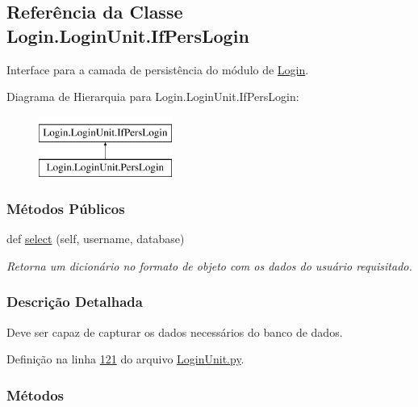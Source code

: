 \hypertarget{classLogin_1_1LoginUnit_1_1IfPersLogin}{}\subsection{Referência da Classe Login.\+Login\+Unit.\+If\+Pers\+Login}
\label{classLogin_1_1LoginUnit_1_1IfPersLogin}


Interface para a camada de persistência do módulo de \hyperlink{namespaceLogin}{Login}.  


Diagrama de Hierarquia para Login.\+Login\+Unit.\+If\+Pers\+Login\+:\begin{figure}[H]
\begin{center}
\leavevmode
\includegraphics[height=2.000000cm]{da/dc3/classLogin_1_1LoginUnit_1_1IfPersLogin}
\end{center}
\end{figure}
\subsubsection*{Métodos Públicos}
\begin{DoxyCompactItemize}
\item 
def \hyperlink{classLogin_1_1LoginUnit_1_1IfPersLogin_a2735e0cf328b85f72cbf655f210d17f6}{select} (self, username, database)
\begin{DoxyCompactList}\small\item\em Retorna um dicionário no formato de objeto com os dados do usuário requisitado. \end{DoxyCompactList}\end{DoxyCompactItemize}


\subsubsection{Descrição Detalhada}
Deve ser capaz de capturar os dados necessários do banco de dados. 

Definição na linha \hyperlink{LoginUnit_8py_source_l00121}{121} do arquivo \hyperlink{LoginUnit_8py_source}{Login\+Unit.\+py}.



\subsubsection{Métodos}
\hypertarget{classLogin_1_1LoginUnit_1_1IfPersLogin_a2735e0cf328b85f72cbf655f210d17f6}{}
